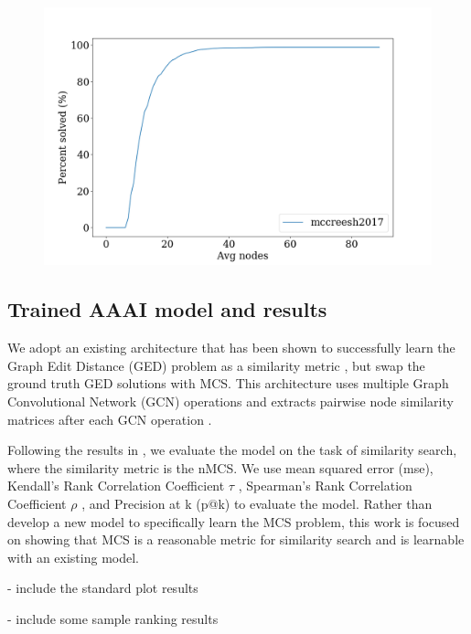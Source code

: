 \begin{figure}
    \centering
    \includegraphics[width=\textwidth]{figures/pct_solved_avg_nodes.png}
    \caption{}
    \label{fig:solution_limits}
\end{figure}



\subsection{Trained AAAI model and results}
We adopt an existing architecture that has been shown to successfully learn the Graph Edit Distance (GED) problem as a similarity metric \cite{bai2018convolutional}, but swap the ground truth GED solutions with MCS. This architecture uses multiple Graph Convolutional Network (GCN) operations \cite{kipf2016semi} and extracts pairwise node similarity matrices after each GCN operation .

Following the results in \cite{bai2018convolutional}, we evaluate the model on the task of similarity search, where the similarity metric is the nMCS. We use mean squared error (mse), Kendall's Rank Correlation Coefficient $\tau$ \cite{kendall1938new}, Spearman's Rank Correlation Coefficient $\rho$ \cite{spearman1904proof}, and Precision at k (p@k) to evaluate the model. Rather than develop a new model to specifically learn the MCS problem, this work is focused on showing that MCS is a reasonable metric for similarity search and is learnable with an existing model.


- include the standard plot results

- include some sample ranking results

